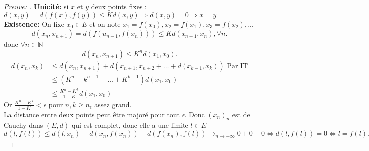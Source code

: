 \documentclass{article}
\theoremstyle{plain}%
\theoremstyle{definition}
\theoremstyle{remark}
\begin{document}
\begin{proof}[Preuve: ]
    \textbf{Unicité:} si $ x $ et $ y $ deux points fixes : $ d(x,y) = d(f(x), f(y)) \leq K d(x,y) \Rightarrow d(x,y) = 0 \Rightarrow x=y$ \\
    \textbf{Existence:} On fixe $ x_0 \in E $ et on note $ x_1 = f(x_0), x_2 = f(x_1), x_3 = f(x_2), ... $ 
    \[
        d(x_n, x _{n+1} ) = d(f(u _{n-1}, f(x_n) )) \leq K d(x _{n-1} , x_n), \forall n
    .\]
    donc $ \forall n \in \mathbb{N} $ 
    \[
        d(x_n, x _{n+1} ) \leq K^n d(x_1,x_0)
    .\]
    \begin{align*}
        d(x_n, x_k) & \leq d(x_n, x_{n+1}) + d(x _{n+1}, x _{n+2} + \dots + d(x_{k-1}, x_k) ) \text{ Par IT} \\
            & \leq (K^n + k^{n+1} + \dots + K^{k-1}) d(x_1, x_0)\\
            & \leq \frac{K^n -K^k}{1-K} d(x_1, x_0)
    \end{align*}
    Or $ \frac{K^n -K^k}{1-K} < \epsilon $ pour $ n,k \geq n_\epsilon  $ assez grand. \\
    La distance entre deux points peut être majoré pour tout $ \epsilon $. Donc $ (x_n)_{n} $ est de Cauchy dans $ (E, d) $ qui est complet, donc elle a une limite $ l \in E $
    \[
        d(l, f(l)) \leq d(l, x_n)_{} + d(x_n, f(x_n)) + d(f(x_n), f(l)) \to_{n \to +\infty } 0 + 0 + 0 \Leftrightarrow d(l, f(l)) = 0 \Leftrightarrow l=f(l)
    .\]
    
\end{proof}
\end{document}
